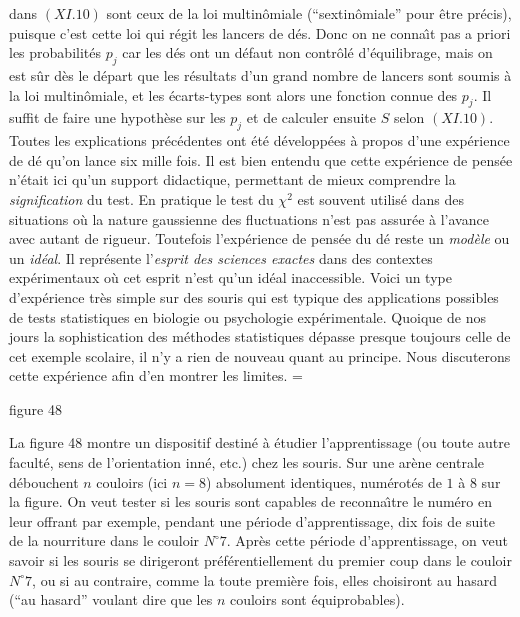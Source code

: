 dans $(XI.10)$ sont ceux de la loi multin\^omiale (``sextin\^omiale''
pour \^etre pr\'ecis), puisque c'est cette loi qui r\'egit les lancers de
d\'es. Donc on ne conna{\^\i}t pas a priori les probabilit\'es $p_j$ car
les d\'es ont un d\'efaut non contr\^ol\'e d'\'equilibrage, mais on est
s\^ur d\`es le d\'epart que les r\'esultats d'un grand nombre de lancers
sont soumis \`a la loi multin\^omiale, et les \'ecarts-types sont alors
une fonction connue des $p_j$. Il suffit de faire une hypoth\`ese sur les
$p_j$ et de calculer ensuite $S$ selon $(XI.10)$. 
\medskip
Toutes les explications pr\'ec\'edentes ont \'et\'e d\'evelopp\'ees \`a 
propos d'une exp\'erience de d\'e qu'on lance six mille fois. Il est bien
entendu que cette exp\'erience de pens\'ee n'\'etait ici qu'un support
didactique, permettant de mieux comprendre la {\it signification} du test.
\medskip
En pratique le test du $\chi^2$ est souvent utilis\'e dans des situations 
o\`u la nature gaussienne des fluctuations n'est pas assur\'ee \`a l'avance
avec autant de rigueur. Toutefois l'exp\'erience de pens\'ee du d\'e reste
un {\it mod\`ele} ou un {\it id\'eal}. Il repr\'esente l'{\it esprit des
sciences exactes} dans des contextes exp\'erimentaux o\`u cet esprit
n'est qu'un id\'eal inaccessible.
\medskip
Voici un type d'exp\'erience tr\`es simple sur des souris qui est typique
des applications possibles de tests statistiques en biologie ou 
psychologie exp\'erimentale. Quoique de nos jours la sophistication des
m\'ethodes statistiques d\'epasse presque toujours celle de cet exemple
scolaire,  il n'y a rien de nouveau quant au principe. Nous discuterons
cette exp\'erience afin d'en montrer les limites.
\smallskip 
\midinsert
\epsfxsize = \hsize
{}
\vskip6.33mm
\centerline{\eightpoint figure 48}
\vskip7mm
\endinsert
\smallskip
La figure 48 montre un dispositif destin\'e \`a \'etudier l'apprentissage 
(ou toute autre facult\'e, sens de l'orientation inn\'e, etc.) chez les 
souris. Sur une ar\`ene centrale d\'ebouchent $n$ couloirs (ici $n=8$)
absolument identiques, num\'erot\'es de $1$ \`a $8$ sur la figure. On 
veut tester si les souris sont capables de reconna{\^\i}tre le num\'ero en
leur offrant par exemple, pendant une p\'eriode d'apprentissage, dix fois 
de suite de la nourriture dans le couloir $N^\circ 7$. Apr\`es cette
p\'eriode d'apprentissage, on veut savoir si les souris se dirigeront
pr\'ef\'erentiellement du premier coup dans le couloir $N^\circ 7$, ou si 
au contraire, comme la toute premi\`ere fois, elles choisiront au hasard
(``au hasard'' voulant dire que les $n$ couloirs sont \'equiprobables).
